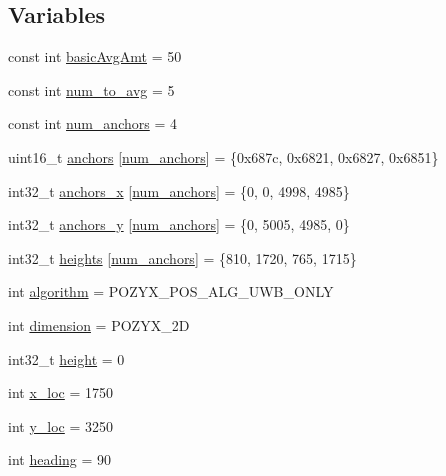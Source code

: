 \subsection*{Variables}
\begin{DoxyCompactItemize}
\item 
const int \mbox{\hyperlink{bot_main_8ino_a5f0abc26cd1e11941fb44168ea055b1a}{basic\+Avg\+Amt}} = 50
\item 
const int \mbox{\hyperlink{bot_main_8ino_a1a7877b55ae0baf9e8b9250195dd3f81}{num\+\_\+to\+\_\+avg}} = 5
\item 
const int \mbox{\hyperlink{bot_main_8ino_af45be5355306144528cdfb308bd00859}{num\+\_\+anchors}} = 4
\item 
uint16\+\_\+t \mbox{\hyperlink{bot_main_8ino_a40781b19eab312bdfa08034230bb64d1}{anchors}} \mbox{[}\mbox{\hyperlink{bot_main_8ino_af45be5355306144528cdfb308bd00859}{num\+\_\+anchors}}\mbox{]} = \{0x687c, 0x6821, 0x6827, 0x6851\}
\item 
int32\+\_\+t \mbox{\hyperlink{bot_main_8ino_ae6db46a34ef60ff16acd025bfcaed344}{anchors\+\_\+x}} \mbox{[}\mbox{\hyperlink{bot_main_8ino_af45be5355306144528cdfb308bd00859}{num\+\_\+anchors}}\mbox{]} = \{0, 0, 4998, 4985\}
\item 
int32\+\_\+t \mbox{\hyperlink{bot_main_8ino_acc43d1150756410770334dba55d59783}{anchors\+\_\+y}} \mbox{[}\mbox{\hyperlink{bot_main_8ino_af45be5355306144528cdfb308bd00859}{num\+\_\+anchors}}\mbox{]} = \{0, 5005, 4985, 0\}
\item 
int32\+\_\+t \mbox{\hyperlink{bot_main_8ino_a9bb54a28aa3c60428997dade71949435}{heights}} \mbox{[}\mbox{\hyperlink{bot_main_8ino_af45be5355306144528cdfb308bd00859}{num\+\_\+anchors}}\mbox{]} = \{810, 1720, 765, 1715\}
\item 
int \mbox{\hyperlink{bot_main_8ino_a92d3a0b679d3adc3b4b513f8e26e7f4c}{algorithm}} = P\+O\+Z\+Y\+X\+\_\+\+P\+O\+S\+\_\+\+A\+L\+G\+\_\+\+U\+W\+B\+\_\+\+O\+N\+LY
\item 
int \mbox{\hyperlink{bot_main_8ino_a1a8a8235879363159315091a1daed72f}{dimension}} = P\+O\+Z\+Y\+X\+\_\+2D
\item 
int32\+\_\+t \mbox{\hyperlink{bot_main_8ino_a5d8006e753a3e76ff637a4e092bbed71}{height}} = 0
\item 
int \mbox{\hyperlink{bot_main_8ino_a9d3947cda218cfaa85dfef513d39c73c}{x\+\_\+loc}} = 1750
\item 
int \mbox{\hyperlink{bot_main_8ino_a3b3154e514a981f07054456331a2e708}{y\+\_\+loc}} = 3250
\item 
int \mbox{\hyperlink{bot_main_8ino_aa0a9c2882aad6535e52a6d429f1d42da}{heading}} = 90

\end{DoxyCompactItemize}

